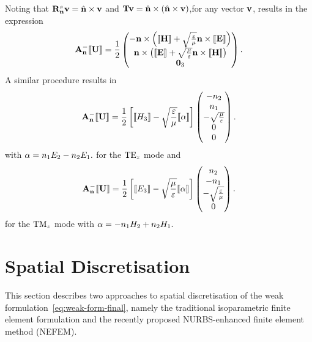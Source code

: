 Noting that $\mathbf{R}^{s}_{\mathbf{n}} \mathbf{v} = \hat{\mathbf{n}} \times \mathbf{v}$ and $\mathbf{T} \mathbf{v} = \hat{\mathbf{n}} \times \left(  \hat{\mathbf{n}}
  \times \mathbf{v} \right)$,for any vector $\mathbf{v}$, results in the expression
\begin{align}
\mathbf{A}_\mathbf{n}^{-} \llbracket \mathbf{U} \rrbracket = \frac{1}{2}
\begin{pmatrix}
  -\mathbf{n} \times \left( \llbracket \mathbf{H} \rrbracket + \sqrt{\frac{\varepsilon}{\mu}} \mathbf{n} \times \llbracket \mathbf{E} \rrbracket \right) \\
   \mathbf{n} \times \left( \llbracket \mathbf{E} \rrbracket + \sqrt{\frac{\mu}{\varepsilon}} \mathbf{n} \times \llbracket \mathbf{H} \rrbracket \right) \\
  \mathbf{0}_3
\end{pmatrix} .
  \label{eq:AnMinuU-expression-3D}
\end{align}
A similar procedure results in
\begin{align}
\mathbf{A}_\mathbf{n}^{-} \llbracket \mathbf{U} \rrbracket =
  \frac{1}{2}
  \left[
    \llbracket H_3 \rrbracket - \sqrt{\frac{\varepsilon}{\mu}} \llbracket \alpha \rrbracket
  \right]
\begin{pmatrix}
   -n_2 \\
   n_1 \\
   - \sqrt{ \frac{\mu}{\varepsilon} } \\
   0  \\
   0 
\end{pmatrix} . \label{eq:AnMinuU-expression-TE}
\end{align}
with $ \alpha = n_1 E_2 - n_2 E_1. $ for the $\textrm{TE}_{z}$ mode and
\begin{align}
\mathbf{A}_\mathbf{n}^{-} \llbracket \mathbf{U} \rrbracket =
  \frac{1}{2}
  \left[
    \llbracket E_3 \rrbracket - \sqrt{\frac{\mu}{\varepsilon}} \llbracket \alpha \rrbracket
  \right]
\begin{pmatrix}
   n_2 \\
   -n_1 \\
   -\sqrt{ \frac{\varepsilon}{\mu} } \\
   0 
\end{pmatrix} . \label{eq:AnMinuU-expression-TM}
\end{align}
for the $\textrm{TM}_{z}$ mode with $ \alpha = - n_1 H_2 + n_2 H_1. $

\section{Spatial Discretisation}
This section describes two approaches to spatial discretisation of the weak formulation~\ref{eq:weak-form-final}, namely the traditional isoparametric finite element formulation and the recently proposed NURBS-enhanced finite element method (NEFEM).

